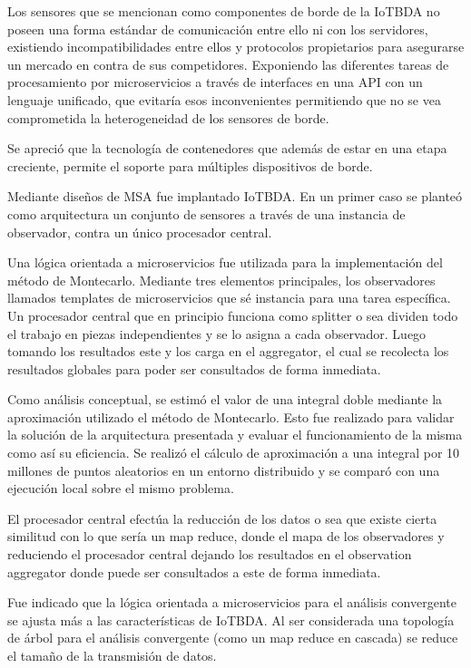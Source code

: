 Los sensores que se mencionan como componentes de borde de la IoTBDA no poseen una forma estándar de comunicación entre ello ni con los servidores, existiendo incompatibilidades entre ellos y protocolos propietarios para asegurarse un mercado en contra de sus competidores. Exponiendo las diferentes tareas de procesamiento por microservicios a través de  interfaces en una API con un lenguaje unificado, que evitaría esos inconvenientes permitiendo que no se vea comprometida la heterogeneidad de los sensores de borde.


Se apreció que la tecnología de contenedores que además de estar  en una etapa creciente, permite el soporte para múltiples dispositivos de borde.


Mediante diseños de MSA fue implantado IoTBDA. En un primer caso se planteó como arquitectura un conjunto de sensores a través de una instancia de observador, contra un único procesador central. 


Una lógica orientada a microservicios fue utilizada para la implementación del método de Montecarlo. Mediante tres elementos principales, los observadores llamados templates de microservicios que sé instancia para una tarea específica. 
Un procesador central que en principio funciona como splitter o sea dividen todo el trabajo en piezas independientes y se lo asigna a cada observador. Luego tomando los resultados este y los carga en el aggregator, el cual se recolecta los resultados globales para poder ser consultados de forma inmediata. 


Como análisis conceptual, se estimó el valor de una integral doble mediante la aproximación utilizado el método de Montecarlo. Esto fue realizado para validar la solución de la arquitectura presentada y evaluar el funcionamiento de la misma como así su eficiencia. Se realizó el cálculo de aproximación a una integral por 10 millones de puntos aleatorios en un entorno distribuido y se comparó con una ejecución local sobre el mismo problema. 


El procesador central efectúa la reducción de los datos o sea que existe cierta similitud con lo que sería un map reduce, donde el mapa de los observadores y reduciendo el procesador central dejando los resultados en el observation aggregator donde puede ser consultados a este de forma inmediata.


Fue indicado que la lógica orientada a microservicios para el análisis convergente se ajusta más a las características de IoTBDA. Al ser considerada una topología de árbol para el análisis convergente (como un map reduce en cascada) se reduce el tamaño de la transmisión de datos. 


